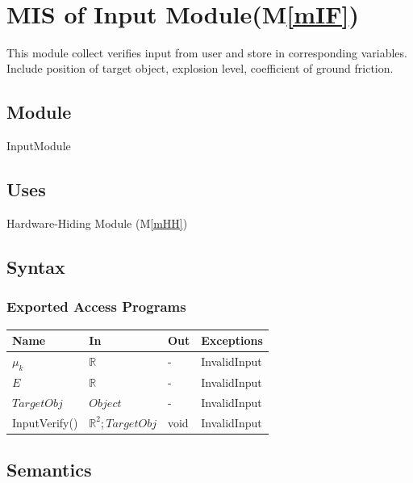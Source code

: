 \documentclass[12pt, titlepage]{article}
\newcommand{\mref}[1]{M\ref{#1}}
\begin{document}
~\newpage

\section{MIS of Input Module(\mref{mIF})} 

This module collect verifies input from user and store in corresponding variables. Include position of target object, explosion level, coefficient of ground friction.

\subsection{Module}

InputModule

\subsection{Uses}

Hardware-Hiding Module (\mref{mHH})

\subsection{Syntax}



\subsubsection{Exported Access Programs}

\begin{center}
\begin{tabular}{p{2cm} p{4cm} p{4cm} p{2cm}}
\hline
\textbf{Name} & \textbf{In} & \textbf{Out} & \textbf{Exceptions} \\
\hline
$\mu_{k}$ &  $\mathbb{R}$ & - & InvalidInput\\
$E$ & $\mathbb{R}$ & - & InvalidInput\\
$TargetObj$ & $Object$ & - & InvalidInput\\
InputVerify() &  $\mathbb{R}^{2}; TargetObj$ & void & InvalidInput\\
\hline
\end{tabular}
\end{center}
\subsection{Semantics}
\end{document}
